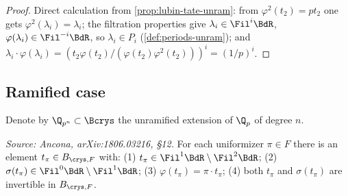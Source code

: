 \begin{proof}
  Direct calculation from \cref{prop:lubin-tate-unram}: from \(\varphi^2(t_2) =
  p t_2\) one gets \(\varphi^2(\lambda_i) = \lambda_i\); the filtration
  properties give \(\lambda_i \in \Fil^i \BdR\), \(\varphi(\lambda_i) \in
  \Fil^{-i} \BdR\), so \(\lambda_i \in P_i\) (\cref{def:periods-unram}); and
  \(\lambda_i \cdot \varphi(\lambda_i) = (t_2 \varphi(t_2)/(\varphi(t_2)
  \varphi^2(t_2)))^i = (1/p)^i\).
\end{proof}

\subsection*{Ramified case}

Denote by \(\Q_{p^n} \subset \Bcrys\) the unramified extension of \(\Q_p\) of
degree \(n\).

\begin{proposition}
  \label{prop:lubin-tate-ram}
  \textit{Source: Ancona, arXiv:1806.03216, \S12.}
  For each uniformizer \(\pi \in F\) there is an element
  \(t_\pi \in B_{\crys,F}\) with:
  (1) \(t_\pi \in \Fil^1 \BdR \setminus \Fil^2 \BdR\);
  (2) \(\sigma(t_\pi) \in \Fil^0 \BdR \setminus \Fil^1 \BdR\);
  (3) \(\varphi(t_\pi) = \pi \cdot t_\pi\);
  (4) both \(t_\pi\) and \(\sigma(t_\pi)\) are invertible in \(B_{\crys,F}\).
\end{proposition}


